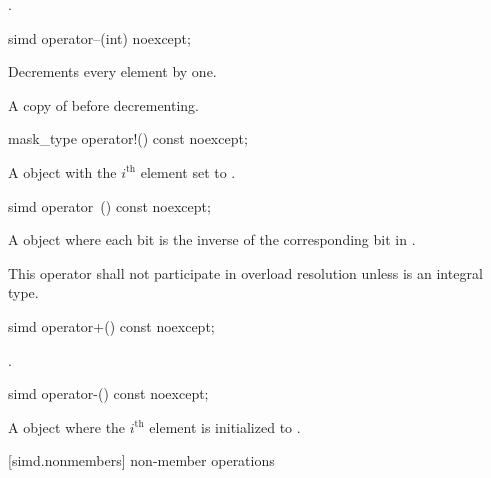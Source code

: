 \begin{wgText}
\begin{itemdescr}
  \pnum\returns
  .
\end{itemdescr}

\begin{itemdecl}
simd operator--(int) noexcept;
\end{itemdecl}

\begin{itemdescr}
  \pnum\effects
  Decrements every element by one.

  \pnum\returns
  A copy of  before decrementing.
\end{itemdescr}

\begin{itemdecl}
mask_type operator!() const noexcept;
\end{itemdecl}

\begin{itemdescr}
  \pnum\returns
  A  object with the $i^\text{th}$ element set to  \foralli.
\end{itemdescr}

\begin{itemdecl}
simd operator~() const noexcept;
\end{itemdecl}

\begin{itemdescr}
  \pnum\returns
  A  object where each bit is the inverse of the corresponding bit in .

  \pnum\remarks
  This operator shall not participate in overload resolution unless  is an integral type.
\end{itemdescr}

\begin{itemdecl}
simd operator+() const noexcept;
\end{itemdecl}

\begin{itemdescr}
  \pnum\returns
  .
\end{itemdescr}

\begin{itemdecl}
simd operator-() const noexcept;
\end{itemdecl}

\begin{itemdescr}
  \pnum\returns
  A  object where the $i^\text{th}$ element is initialized to  \foralli.
\end{itemdescr}

[simd.nonmembers]{ non-member operations}


\end{wgText}
